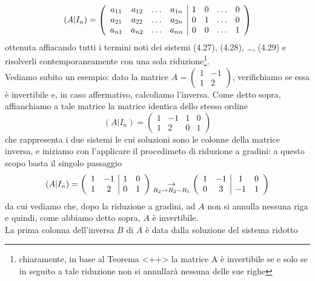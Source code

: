 \begin{equation}
  \label{eq:4.30}
  (A|I_n)=\left(
    \begin{array}[center]{cccc|cccc}
      a_{11} & a_{12} & \dots & a_{1n} & 1 & 0 & \dots &0\\
      a_{21} & a_{22} & \dots & a_{2n} & 0 & 1 & \dots &0\\
      a_{n1} & a_{n2} & \dots & a_{nn} & 0 & 0 & \dots &1 
    \end{array}
    \right)
\end{equation}
ottenuta affiacando tutti i termini noti dei sistemi (4.27), (4.28), \dots, (4.29) e risolverli
contemporaneamente con una sola riduzione\footnote{chiaramente, in base al Teorema <++> la matrice A è
  invertibile se e solo se in seguito a tale riduzione non si annullarà nessuna delle sue righe}.\\
Vediamo subito un esempio: dato la matrice $A=
\begin{pmatrix}
  1 & -1\\
  1 & 2
\end{pmatrix}
$, verifichiamo se essa è invertibile e, in caso affermativo, calcoliamo l'inversa. Come detto sopra,
affianchiamo a tale matrice la matrice identica dello stesso ordine
\begin{equation*}
  (A|I_n)=\left(
  \begin{array}{cc|cc}
    1&-1&1&0\\
    1&2&0&1
  \end{array}\right)
\end{equation*}
che rappresenta i due sistemi le cui soluzioni sono le colonne della matrice inversa, e iniziamo con
l'applicare il procedimeto di riduzione a gradini: a questo scopo basta il singolo passaggio
\begin{equation}
  \label{eq:4.31}
  (A|I_n)=\left(
  \begin{array}{cc|cc}
    1&-1&1&0\\
    1&2&0&1
  \end{array}\right) \underset{R_2\to R_2-R_1}{\to} \left(
  \begin{array}[center]{cc|cc}
    1 &-1 & 1 &0\\
    0 & 3 & -1 &1
  \end{array}\right)
\end{equation}
da cui vediamo che, dopo la riduzione a gradini, ad $A$ non si annulla nessuna riga e quindi, come abbiamo detto
sopra, $A$ è invertibile.\\
La prima colonna dell'inversa $B$ di $A$ è data dalla soluzione del sistema ridotto
